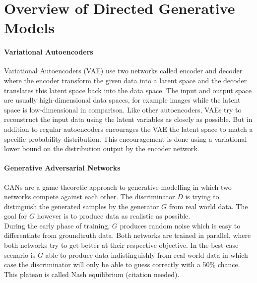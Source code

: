 \section{Overview of Directed Generative Models}
\label{sec:overview}


\paragraph{Variational Autoencoders\cite{vae:2013}}
\label{par:overview_vae}
Variational Autoencoders (VAE) use two networks called encoder and decoder where the encoder transform the given data into a latent space and the decoder translates this latent space back into the data space.
The input and output space are usually high-dimensional data spaces, for example images while the latent space is low-dimensional in comparison.
Like other autoencoders, VAEs try to reconstruct the input data using the latent variables as closely as possible.
But in addition to regular autoencoders encourages the VAE the latent space to match a specific probability distribution.
This encouragement is done using a variational lower bound on the distribution output by the encoder network.







\paragraph{Generative Adversarial Networks}
\label{par:overview_gan}
GANs are a game theoretic approach to generative modelling
in which two networks compete against each other.
The discriminator $D$ is trying to distinguish the generated samples
by the generator $G$ from real world data.
The goal for $G$ however is to produce data as realistic as possible.\\
During the early phase of training, $G$ produces random noise which
is easy to differentiate from groundtruth data.
Both networks are trained in parallel, where both networks try to get better
at their respective objective.
In the best-case scenario is $G$ able to produce data indistinguishly from real world data in which
case the discriminator will only be able to guess correctly with a 50\% chance.
This plateau is called Nash equilibrium (citation needed).




